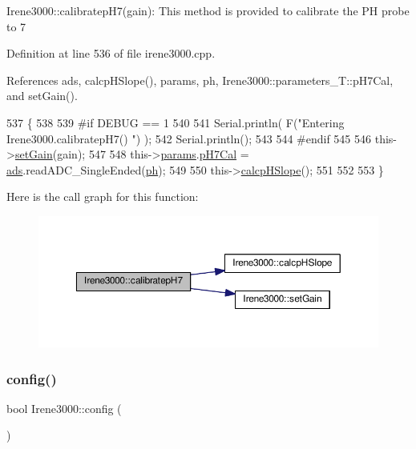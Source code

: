 Irene3000\+::calibratep\+H7(gain)\+: This method is provided to calibrate the PH probe to 7 

Definition at line 536 of file irene3000.\+cpp.



References ads, calcp\+H\+Slope(), params, ph, Irene3000\+::parameters\+\_\+\+T\+::p\+H7\+Cal, and set\+Gain().


\begin{DoxyCode}
537 \{
538 
539 \textcolor{preprocessor}{#if DEBUG == 1 }
540 
541     Serial.println( F(\textcolor{stringliteral}{"Entering Irene3000.calibratepH7() "}) );
542     Serial.println();
543 
544 \textcolor{preprocessor}{#endif }
545 
546     this->\hyperlink{classIrene3000_aff7c5da186b388e7272e63ff88a20c34}{setGain}(gain);
547         
548     this->\hyperlink{classIrene3000_a136585a5ee7f9ac6ab52175fa153f8e3}{params}.\hyperlink{structIrene3000_1_1parameters__T_a21265466a570d84bff914f26d2f7a03e}{pH7Cal} = \hyperlink{classIrene3000_a1215e77ba761c9908d80d691f149e135}{ads}.readADC\_SingleEnded(\hyperlink{Irene3000_8h_af771ceafe0e6524dd8497d4305dfe778}{ph});
549  
550     this->\hyperlink{classIrene3000_a81f6a79e546679692053f7ac1af49613}{calcpHSlope}();
551 
552 
553 \}
\end{DoxyCode}
Here is the call graph for this function\+:\nopagebreak
\begin{figure}[H]
\begin{center}
\leavevmode
\includegraphics[width=350pt]{classIrene3000_a2e810ddfa8b95eaa2446a408761c6bdc_cgraph}
\end{center}
\end{figure}
\mbox{\label{classIrene3000_afed5c35e4b23963c157847ef27c11e9c}} 
\subsubsection{\texorpdfstring{config()}{config()}}
{\footnotesize\ttfamily bool Irene3000\+::config (\begin{DoxyParamCaption}{ }\end{DoxyParamCaption})}

